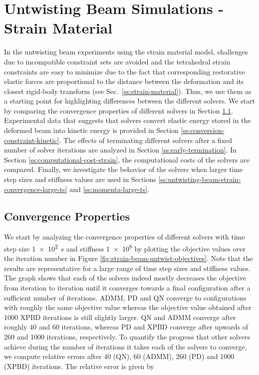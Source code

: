 \section{Untwisting Beam Simulations - Strain Material}\label{ss:untwisting-beam-strain}
In the untwisting beam experiments using the strain material model, challenges due to incompatible constraint sets are avoided and the tetrahedral strain constraints are 
easy to minimize due to the fact that corresponding restorative elastic forces are proportional to the distance between the deformation and its closest rigid-body 
transform (see Sec.\ \ref{ss:strain-material}). Thus, we use them as a starting point for highlighting differences between the different solvers. We start by comparing the 
convergence properties of different solvers in Section \ref{ss:untwisting-beam-strain-convergence}. Experimental data that suggests that solvers 
convert elastic energy stored in the deformed beam into kinetic energy is provided in Section \ref{ss:conversion-constraint-kinetic}. The effects of terminating different 
solvers after a fixed number of solver iterations are analyzed in Section \ref{ss:early-termination}. In Section \ref{ss:computational-cost-strain}, the computational costs 
of the solvers are compared. Finally, we investigate the behavior of the solvers when larger time step sizes and stiffness values are used in Sections 
\ref{ss:untwisting-beam-strain-convergence-large-ts} and \ref{ss:momenta-large-ts}.

\subsection{Convergence Properties}\label{ss:untwisting-beam-strain-convergence}
We start by analyzing the convergence properties of different solvers with time step size \SI{1e2}{\second} and stiffness \num{1e8} by plotting the objective values over the 
iteration number in Figure \ref{fig:strain-beam-untwist-objectives}. Note that the results are representative for a large range of time step sizes and stiffness 
values. The graph shows that each of the solvers indeed mostly decreases the objective from iteration to iteration until it converges towards a final configuration 
after a sufficient number of iterations. ADMM, PD and QN converge to configurations with roughly the same objective value whereas the objective value obtained after 1000 
XPBD iterations is still slightly larger. QN and ADMM converge after roughly 40 and 60 iterations, whereas PD and XPBD converge after upwards of 260 and 1000 iterations, 
respectively. To quantify the progress that other solvers achieve during the number of iterations it takes each of the solvers to converge, we compute relative errors after 
40 (QN), 60 (ADMM), 260 (PD) and 1000 (XPBD) iterations. The relative error is given by 

